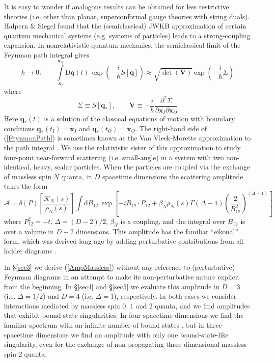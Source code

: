 It is easy to wonder if analogous results can be obtained for less restrictive theories (i.e. other than planar, superconformal gauge theories with string duals). Halpern \& Siegel \cite{HalpernSiegel} found that the (semiclassical) JWKB approximation of certain quantum mechanical systems (e.g. systems of particles) leads to a strong-coupling expansion. In nonrelativistic quantum mechanics, the semiclassical limit of the Feynman path integral gives
\begin{equation}
	\hbar \rightarrow 0: \qquad \int\limits_{\mathbf{x}_{I}}^{\mathbf{x}_{O}} \mathrm{D}\mathbf{q}(t) \, \exp{\left( - \frac{i}{\hbar} S[\mathbf{q}] \right)} \approx \sqrt{\det{(\mathbf{V})}} \exp{\left( - \frac{i}{\hbar} \Sigma \right)} \label{FeynmanPath}
\end{equation}
where
\begin{equation}
	\Sigma \equiv S[\mathbf{q}_{*}], \qquad \mathbf{V} \equiv - \frac{i}{\hbar} \frac{\partial^{2} \Sigma}{\partial \mathbf{x}_{I} \partial \mathbf{x}_{O}}
\end{equation}
Here $\mathbf{q}_{*}(t)$ is a solution of the classical equations of motion with boundary conditions $\mathbf{q}_{*}(t_{I}) = \mathbf{x}_{I}$ and $\mathbf{q}_{*}(t_{O}) = \mathbf{x}_{O}$. The right-hand side of (\ref{FeynmanPath}) is sometimes known as the Van Vleck-Morette approximation to the path integral \cite{VanVleck,CartierMorette}. We use the relativistic sister of this approximation to study four-point near-forward scattering (i.e. small-angle) in a system with two non-identical, heavy, scalar particles. When the particles are coupled via the exchange of massless spin $N$ quanta, in $D$ spacetime dimensions the scattering amplitude takes the form
\begin{equation}
	\mathcal{A} = \delta(P) \left[ \frac{\mathcal{K}_{N}(s)}{\rho_{N}(s)} \right] \int \mathrm{d}B_{12} \, \exp{\left[ - i B_{12} \cdot P_{12} + \beta_{N} \rho_{N}(s) \Gamma(\Delta - 1) \left( \frac{2}{B_{12}^{2}} \right)^{(\Delta - 1)} \right]} \label{AmpMassless}
\end{equation}
where $P_{12}^{2} = -t$, $\Delta = (D - 2)/2$, $\beta_{N}$ is a coupling, and the integral over $B_{12}$ is over a volume in $D - 2$ dimensions. This amplitude has the familiar ``eikonal'' form, which was derived long ago by adding perturbative contributions from all ladder diagrams \cite{ChengWuPRL,AbarbItzyk,LevySucher1,ChangMa}.

In \S\ref{sec3} we derive (\ref{AmpMassless}) without any reference to (perturbative) Feynman diagrams in an attempt to make its non-perturbative nature explicit from the beginning. In \S\ref{sec4} and \S\ref{sec5} we evaluate this amplitude in $D = 3$ (i.e. $\Delta = 1/2$) and $D = 4$ (i.e. $\Delta = 1$), respectively. In both cases we consider interactions mediated by massless spin $0$, $1$ and $2$ quanta, and we find amplitudes that exhibit bound state singularities. In four spacetime dimensions we find the familiar spectrum with an infinite number of bound states \cite{BIZJ,KabatOrtiz,Dittrich}, but in three spacetime dimensions we find an amplitude with only one bound-state-like singularity, even for the exchange of non-propagating three-dimensional massless spin $2$ quanta.

